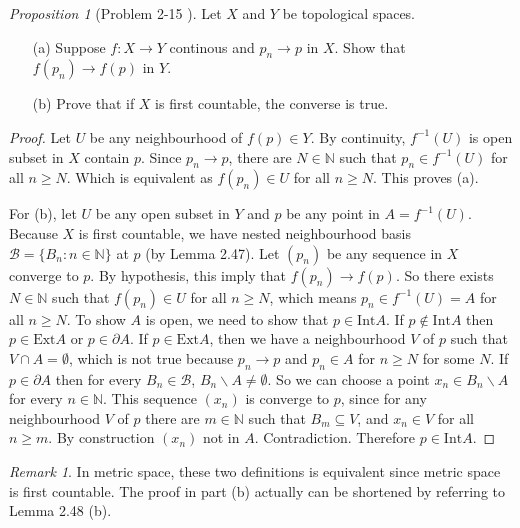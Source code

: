 \documentclass[a4paper]{article}
\theoremstyle{remark}
\newtheorem*{remark}{Remark}
\newtheorem{prop}{Proposition}
\newcommand{\doo}{\partial}    %
\begin{document}
\begin{prop}[Problem 2-15 \cite{LeeTM}]
Let $X$ and $Y$ be topological spaces.
\begin{enumerate}[nolistsep]
\item[(a)] Suppose $f : X \to Y$ continous and $p_n \to p$ in $X$. Show that $f(p_n) \to f(p)$ in $Y$.
\item[(b)] Prove that if $X$ is first countable, the converse is true.
\end{enumerate}
\end{prop}
\begin{proof}
Let $U$ be any neighbourhood of $f(p) \in Y$. By continuity, $f^{-1}(U)$ is open subset in $X$ contain $p$. Since $p_n \to p$, there are $N \in \mathbb{N}$ such that $p_n \in f^{-1}(U)$ for all $n \geq N$. Which is equivalent as $f(p_n) \in U$ for all $n \geq N$. This proves (a). 

For (b), let $U$ be any open subset in $Y$ and $p$ be any point in $A = f^{-1}(U)$.  Because $X$ is first countable, we have nested neighbourhood basis $\mathcal{B} = \{B_n : n\in \mathbb{N}\}$ at $p$ (by Lemma 2.47). Let $(p_n)$ be any sequence in $X$ converge to $p$. By hypothesis, this imply that $f(p_n)\to f(p)$. So there exists $N \in \mathbb{N}$ such that $f(p_n) \in U$ for all $n\geq N$, which means $p_n \in f^{-1}(U)=A$ for all $n\geq N$.  To show $A$ is open, we need to show that $p \in \text{Int} A$. If $p \notin \text{Int}A$ then $p \in \text{Ext}A$ or $p \in \doo A$. If $p \in \text{Ext}A$, then we have a neighbourhood $V$ of $p$ such that $V \cap A = \emptyset$, which is not true because $p_n \to p$ and $p_n \in A$ for $n\geq N$ for some $N$. If $p \in \doo A$ then for every $B_n \in \mathcal{B}$, $B_n \smallsetminus A \neq \emptyset$. So we can choose a point $x_n \in B_n \smallsetminus A$ for every $n \in \mathbb{N}$. This sequence $(x_n)$ is converge to $p$, since for any neighbourhood $V$ of $p$ there are $m\in \mathbb{N}$ such that $B_m \subseteq V$, and $x_n \in V$ for all $n\geq m$. By construction $(x_n)$ not in $A$. Contradiction. Therefore $p \in \text{Int}A$.
\end{proof}
\begin{remark}
In metric space, these two definitions is equivalent since metric space is first countable. The proof in part (b) actually can be shortened by referring to Lemma 2.48 (b).
\end{remark}
\end{document}

